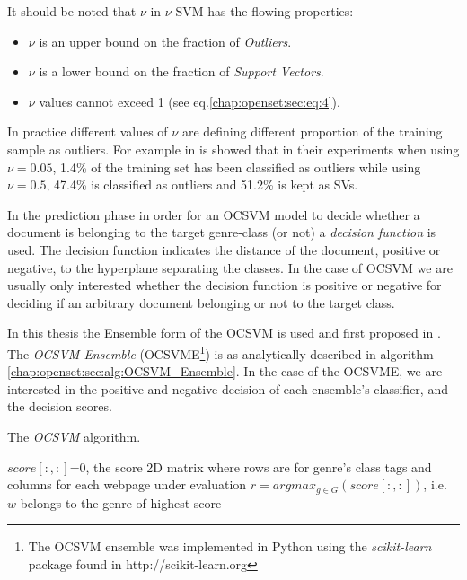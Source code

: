 It should be noted that $\nu$ in $\nu$-SVM has the flowing properties:
\begin{itemize}
	\item $\nu$ is an upper bound on the fraction of \textit{Outliers}.
	\item $\nu$ is a lower bound on the fraction of \textit{Support Vectors}.
	\item $\nu$ values cannot exceed 1 (see eq.\ref{chap:openset:sec:eq:4}).
\end{itemize}

In practice different values of $\nu$ are defining different proportion of the training sample as outliers. For example in \parencite{scholkopf1999estimating} is showed that in their experiments when using $\nu=0.05$, 1.4\% of the training set has been classified as outliers while using $\nu=0.5$, 47.4\% is classified as outliers and 51.2\% is kept as SVs.

In the prediction phase in order for an OCSVM model to decide whether a document is belonging to the target genre-class (or not) a \textit{decision function} is used. The decision function indicates the distance of the document, positive or negative, to the hyperplane separating the classes. In the case of OCSVM we are usually only interested whether the decision function is positive or negative for deciding if an arbitrary document belonging or not to the target class.

In this thesis the Ensemble form of the OCSVM is used and first proposed in \parencite{pritsos2013open}. The \textit{OCSVM Ensemble} (OCSVME\footnote{The OCSVM ensemble was implemented in Python using the \textit{scikit-learn} package found in http://scikit-learn.org}) is as analytically described in algorithm \ref{chap:openset:sec:alg:OCSVM_Ensemble}. In the case of the OCSVME, we are interested in the positive and negative decision of each ensemble's classifier, and the decision scores.

\hfill

\begin{algorithm}[H]
\caption{The \textit{OCSVM} algorithm.}\label{chap:openset:sec:alg:OCSVM_Ensemble}
$score[:, :]$=0, the score 2D matrix where rows are for genre's class tags and columns for each webpage under evaluation
{
        $r = argmax_{g \in G}(score[:, :])$, i.e. $w$ belongs to the genre of highest score\;
    }
\end{algorithm}

